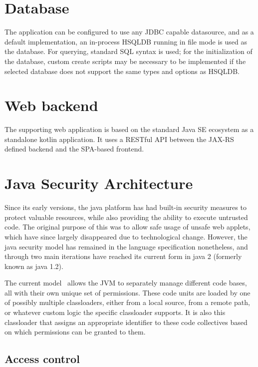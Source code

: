 	\section{Database}
 
 	The application can be configured to use any JDBC capable datasource, and as a default implementation, an in-process HSQLDB running in file mode is used as the database. For querying, standard SQL syntax is used; for the initialization of the database, custom create scripts may be necessary to be implemented if the selected database does not support the same types and options as HSQLDB.

	\section{Web backend}
	
	The supporting web application is based on the standard Java SE ecosystem as a standalone kotlin application. It uses a RESTful API between the JAX-RS defined backend and the SPA-based frontend.

	\section{Java Security Architecture}
	
	Since its early versions, the java platform has had built-in security measures to protect valuable resources, while also providing the ability to execute untrusted code. The original purpose of this was to allow safe usage of unsafe web applets, which have since largely disappeared due to technological change. However, the java security model has remained in the language specification nonetheless, and through two main iterations have reached its current form in java 2 (formerly known as java 1.2).
	
	The current model~\cite{JavaSandbox} allows the JVM to separately manage different code bases, all with their own unique set of permissions. These code units are loaded by one of possibly multiple classloaders, either from a local source, from a remote path, or whatever custom logic the specific classloader supports. It is also this classloader that assigns an appropriate identifier to these code collectives based on which permissions can be granted to them.
	
	\subsection{Access control}
	
